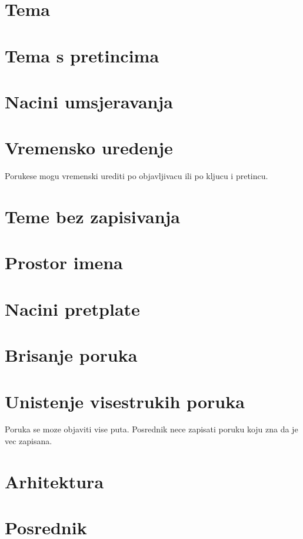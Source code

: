 \documentclass[times, utf8, diplomski, numeric]{fer}
\begin{document}
\chapter{Tema}
 

\chapter{Tema s pretincima}

\chapter{Nacini umsjeravanja}


\chapter{Vremensko uredenje}
Porukese mogu vremenski urediti po objavljivacu ili po kljucu i pretincu.

\chapter{Teme bez zapisivanja}

\chapter{Prostor imena}

\chapter{Nacini pretplate}


\chapter{Brisanje poruka}

\chapter{Unistenje visestrukih poruka}
Poruka se moze objaviti vise puta. Posrednik nece zapisati poruku koju zna da je vec zapisana.

\chapter{Arhitektura}


\chapter{Posrednik}
\end{document}
